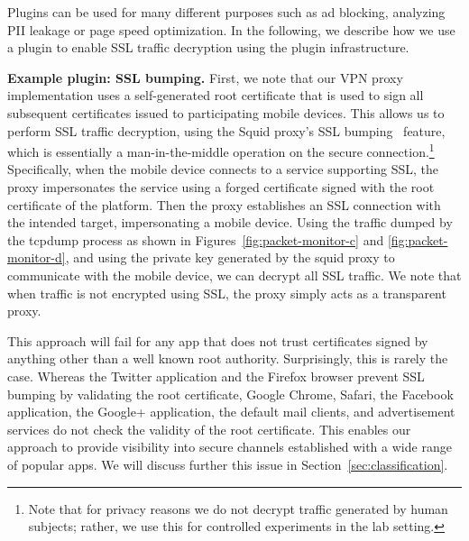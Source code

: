 Plugins can be used for many different purposes such as ad blocking, 
analyzing PII leakage or page speed optimization. In the following, we 
describe how we use a plugin to enable SSL traffic decryption using 
the \platname{} plugin infrastructure. 


\noindent\textbf{Example plugin: SSL bumping.} 
First, we note that our VPN proxy implementation uses a self-generated 
\platname{} root certificate that is used to sign all subsequent certificates 
issued to participating mobile devices. This allows us to perform SSL 
traffic decryption, using the Squid proxy's SSL bumping~\cite{sslbump}
feature, which is essentially a man-in-the-middle operation 
on the secure connection.\footnote{Note that for privacy reasons we do not 
decrypt traffic generated by human subjects; rather, we use this for controlled 
experiments in the lab setting.} Specifically, when the mobile device connects 
to a service supporting SSL, the proxy impersonates the service using a forged certificate signed
with the root certificate of the \platname{} platform. Then the proxy
establishes an SSL connection with the intended target, impersonating a mobile
device. Using the traffic dumped by the tcpdump process as shown in
Figures~\ref{fig:packet-monitor-c} and \ref{fig:packet-monitor-d}, and
using the private key generated by the squid proxy to communicate with
the mobile device, we can decrypt all SSL traffic. We note that when
traffic is not encrypted using SSL, the proxy simply acts as a
transparent proxy. 

This approach will fail for any app that does not trust certificates 
signed by anything other than a well known root authority. 
Surprisingly, this is rarely the case. Whereas the
Twitter application and the Firefox browser prevent SSL bumping by
validating the root certificate, Google Chrome, Safari, the Facebook
application, the Google+ application, the default mail clients, and
advertisement services do not check the validity of the root
certificate. This enables our approach to provide visibility into 
secure channels established with a wide range of popular apps. We will discuss
further this issue in Section~\ref{sec:classification}. 


